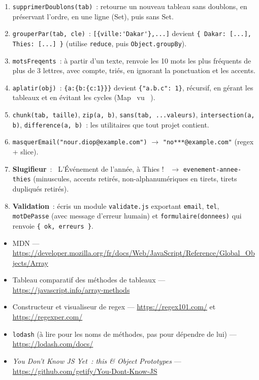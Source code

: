 \begin{exercice}
\begin{enumerate}
  \item \verb|supprimerDoublons(tab)|~: retourne un nouveau tableau sans doublons, en
        pr\'eservant l'ordre, en une ligne (Set), puis sans Set.
  \item \verb|grouperPar(tab, cle)|~: \verb|[{ville:'Dakar'},...]| devient
        \verb|{ Dakar: [...], Thies: [...] }| (utilise \verb|reduce|, puis \verb|Object.groupBy|).
  \item \verb|motsFreqents|~: \`a partir d'un texte, renvoie les 10 mots les plus fr\'equents de
        plus de 3 lettres, avec compte, tri\'es, en ignorant la ponctuation et les accents.
  \item \verb|aplatir(obj)|~: \verb|{a:{b:{c:1}}}| devient \verb|{"a.b.c": 1}|, r\'ecursif, en
        g\'erant les tableaux et en \'evitant les cycles (Map \og ~vu~ \fg{}).
  \item \verb|chunk(tab, taille)|, \verb|zip(a, b)|, \verb|sans(tab, ...valeurs)|,
        \verb|intersection(a, b)|, \verb|difference(a, b)|~: les utilitaires que tout projet contient.
  \item \verb|masquerEmail("nour.diop@example.com")| $\rightarrow$ \verb|"no***@example.com"| (regex + slice).
  \item \textbf{Slugifieur}~: \og ~L'\'Ev\'enement de l'ann\'ee, \`a Thies !~ \fg{} $\rightarrow$ \verb|evenement-annee-thies|
        (minuscules, accents retir\'es, non-alphanum\'eriques en tirets, tirets dupliqu\'es retir\'es).
  \item \textbf{Validation}~: \'ecris un module \verb|validate.js| exportant \verb|email|,
        \verb|tel|, \verb|motDePasse| (avec message d'erreur humain) et \verb|formulaire(donnees)|
        qui renvoie \verb|{ ok, erreurs }|.
\end{enumerate}
\end{exercice}

\begin{ressources}
\begin{itemize}
  \item MDN --- \url{https://developer.mozilla.org/fr/docs/Web/JavaScript/Reference/Global_Objects/Array}
  \item Tableau comparatif des m\'ethodes de tableaux --- \url{https://javascript.info/array-methods}
  \item Constructeur et visualiseur de regex --- \url{https://regex101.com/} et \url{https://regexper.com/}
  \item \verb|lodash| (\`a lire pour les noms de m\'ethodes, pas pour d\'ependre de lui) --- \url{https://lodash.com/docs/}
  \item \emph{You Don't Know JS Yet~: this \& Object Prototypes} --- \url{https://github.com/getify/You-Dont-Know-JS}
\end{itemize}
\end{ressources}

